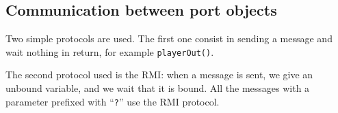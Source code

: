 \subsection{Communication between port objects}
Two simple protocols are used. The first one consist in sending a message and wait nothing in return, for example \texttt{playerOut()}.

The second protocol used is the RMI: when a message is sent, we give an unbound variable, and we wait that it is bound. All the messages with a parameter prefixed with \textquotedblleft{}\texttt{?}\textquotedblright{} use the RMI protocol.

